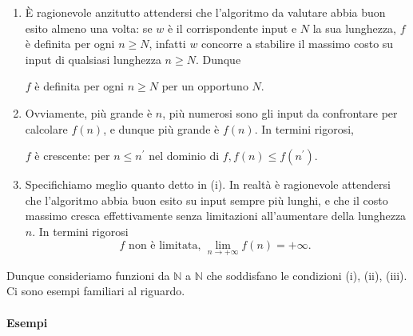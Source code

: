 \begin{enumerate}[label=(\roman*)]
    \item È ragionevole
          anzitutto attendersi che l'algoritmo da valutare abbia buon esito almeno una
          volta: se $w$ è il corrispondente input e $N$ la sua lunghezza, $f$ è definita
          per ogni $n \geq N$, infatti $w$ concorre a stabilire il massimo costo su input
          di qualsiasi lunghezza $n \geq N$. Dunque

          \begin{center}
              $f$ è definita per ogni $n \geq N$ per un opportuno $N$.
          \end{center}

    \item Ovviamente, più grande è $n$, più numerosi sono gli input
          da confrontare per calcolare $f(n)$, e dunque più grande è $f(n)$. In termini
          rigorosi,

          \begin{center}
              $f$ è crescente: per $n \leq n^{\prime}$ nel dominio di $f, f(n) \leq
                  f\left(n^{\prime}\right)$.
          \end{center}

    \item Specifichiamo meglio quanto detto in (i). In
          realtà è ragionevole attendersi che l'algoritmo abbia buon esito su input sempre
          più lunghi, e che il costo massimo cresca effettivamente senza limitazioni
          all'aumentare della lunghezza $n$. In termini rigorosi
          $$
              f \text { non è limitata, } \lim _{n \rightarrow+\infty} f(n)=+\infty \text {. }
          $$
\end{enumerate}

Dunque consideriamo funzioni da $\mathbb{N}$ a $\mathbb{N}$ che soddisfano le
condizioni (i), (ii), (iii). Ci sono esempi familiari al riguardo.

\paragraph{Esempi}

